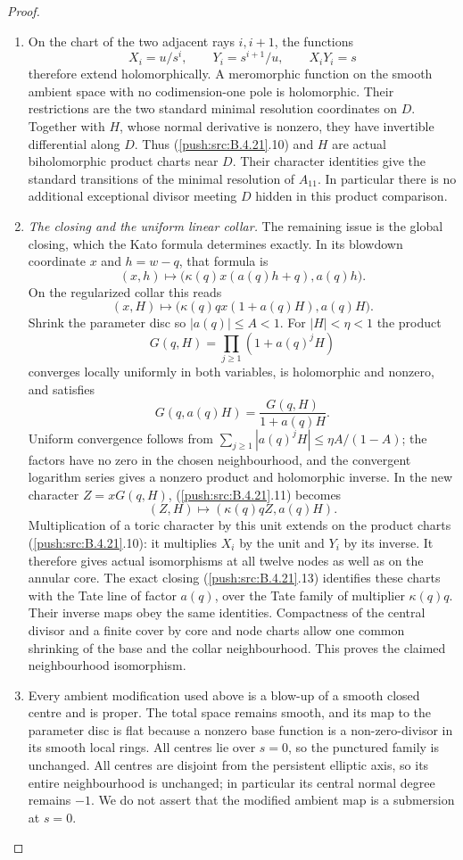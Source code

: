 \begin{proof}
\begin{enumerate}[label=\arabic*.,leftmargin=*]
\item On the chart of the two adjacent rays $i,i+1$, the functions
\[
 X_i=u/s^i,\qquad Y_i=s^{i+1}/u,
 \qquad X_iY_i=s
 \tag{B.4.21.10}
\]
therefore extend holomorphically.  A meromorphic function on
the smooth ambient space with no codimension-one pole is
holomorphic.  Their restrictions are the two standard minimal
resolution coordinates on $D$.  Together with $H$, whose
normal derivative is nonzero, they have invertible differential
along $D$.  Thus (\ref{push:src:B.4.21}.10) and $H$ are actual biholomorphic
product charts near $D$.  Their character identities give the
standard transitions of the minimal resolution of $A_{11}$.
In particular there is no additional exceptional divisor
meeting $D$ hidden in this product comparison.

\item \emph{The closing and the uniform linear collar.}
The remaining issue is the global closing, which the Kato
formula determines exactly.  In its blowdown coordinate $x$
and $h=w-q$, that formula is
\[
 (x,h)\longmapsto
 \bigl(\kappa(q)x(a(q)h+q),a(q)h\bigr).
\]
On the regularized collar this reads
\[
 (x,H)\longmapsto
 \bigl(\kappa(q)q x(1+a(q)H),a(q)H\bigr).
 \tag{B.4.21.11}
\]
Shrink the parameter disc so $|a(q)|\le A<1$.
For $|H|<\eta<1$ the product
\[
 G(q,H)=\prod_{j\ge1}(1+a(q)^jH)
 \tag{B.4.21.12}
\]
converges locally uniformly in both variables, is holomorphic
and nonzero, and satisfies
\[
 G(q,a(q)H)=\frac{G(q,H)}{1+a(q)H}.
\]
Uniform convergence follows from
$\sum_{j\ge1}|a(q)^jH|\le\eta A/(1-A)$; the factors have
no zero in the chosen neighbourhood, and the convergent
logarithm series gives a nonzero product and holomorphic inverse.
In the new character $Z=xG(q,H)$, (\ref{push:src:B.4.21}.11) becomes
\[
 (Z,H)\longmapsto
       (\kappa(q)qZ,a(q)H).
 \tag{B.4.21.13}
\]
Multiplication of a toric character by this unit extends on
the product charts (\ref{push:src:B.4.21}.10): it multiplies $X_i$ by the
unit and $Y_i$ by its inverse.  It therefore gives actual
isomorphisms at all twelve nodes as well as on the annular
core.  The exact closing (\ref{push:src:B.4.21}.13) identifies these charts
with the Tate line of factor $a(q)$, over the Tate family
of multiplier $\kappa(q)q$.  Their inverse maps obey the
same identities.  Compactness of the central divisor and
a finite cover by core and node charts allow one common
shrinking of the base and the collar neighbourhood.
This proves the claimed neighbourhood isomorphism.

\item Every ambient modification used above is a blow-up of a smooth
closed centre and is proper.  The total space remains smooth,
and its map to the parameter disc is flat because a nonzero
base function is a non-zero-divisor in its smooth local rings.
All centres lie over $s=0$, so the punctured family is unchanged.
All centres are disjoint from the persistent elliptic axis,
so its entire neighbourhood is unchanged; in particular its
central normal degree remains $-1$.
We do not assert that the modified ambient map is a submersion
at $s=0$.


\end{enumerate}
\end{proof}
